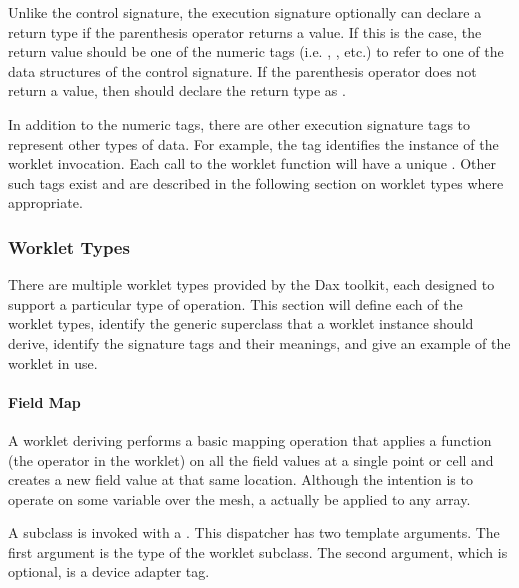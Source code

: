 Unlike the control signature, the execution signature optionally can
declare a return type if the parenthesis operator returns a value. If this
is the case, the return value should be one of the numeric tags
(i.e. , , etc.) to refer to one of the data
structures of the control signature. If the parenthesis operator does not
return a value, then \executionsignature should declare the return type as
.

In addition to the numeric tags, there are other execution signature tags
to represent other types of data. For example, the  tag
identifies the instance of the worklet invocation. Each call to the worklet
function will have a unique . Other such tags exist and are
described in the following section on worklet types where appropriate.


\subsubsection{Worklet Types}
\label{sec:WorkletTypes}


There are multiple worklet types provided by the Dax toolkit, each designed
to support a particular type of operation. This section will define each of
the worklet types, identify the generic superclass that a worklet instance
should derive, identify the signature tags and their meanings, and give an
example of the worklet in use.

\paragraph{Field Map}


A worklet deriving  performs a basic mapping
operation that applies a function (the operator in the worklet) on all the
field values at a single point or cell and creates a new field value at
that same location. Although the intention is to operate on some variable
over the mesh, a  actually be applied to any
array.

A  subclass is invoked with a
. This dispatcher has two template
arguments. The first argument is the type of the worklet subclass. The
second argument, which is optional, is a device adapter tag.

